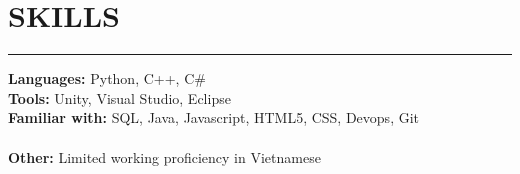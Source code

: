 \documentclass{article}
\begin{document}
\section*{SKILLS} \vspace{-6pt} \hrule \vspace{6pt}
\textbf{Languages:} Python, C++, C$\#$ \\
\textbf{Tools:} Unity, Visual Studio, Eclipse\\
\textbf{Familiar with:} SQL, Java, Javascript, HTML5, CSS, Devops, Git \\\vspace{-6pt}\\
\textbf{Other:} Limited working proficiency in Vietnamese
\end{document}
